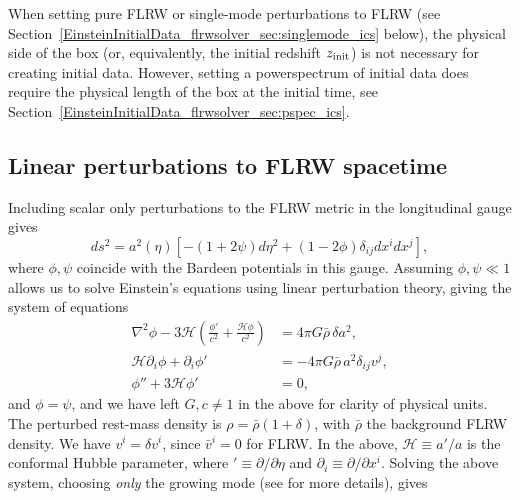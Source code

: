When setting pure FLRW or single-mode perturbations to FLRW (see Section~\ref{EinsteinInitialData_flrwsolver_sec:singlemode_ics} below), the physical side of the box (or, equivalently, the initial redshift $z_{\rm init}$) is not necessary for creating initial data. However, setting a powerspectrum of initial data does require the physical length of the box at the initial time, see Section~\ref{EinsteinInitialData_flrwsolver_sec:pspec_ics}.


\subsection{Linear perturbations to FLRW spacetime}

Including scalar only perturbations to the FLRW metric in the longitudinal gauge gives
\begin{equation}\label{EinsteinInitialData_flrwsolver_eq:perturbed_metric}
	ds^2 = a^2(\eta) \left[ - \left(1 + 2\psi\right) d\eta^2 + \left(1 - 2\phi \right) \delta_{ij}dx^i dx^j \right],
\end{equation}
where $\phi,\psi$ coincide with the Bardeen potentials \cite{EinsteinInitialData_flrwsolver_bardeen1980} in this gauge. Assuming $\phi,\psi\ll1$ allows us to solve Einstein's equations using linear perturbation theory, giving the system of equations \cite{EinsteinInitialData_flrwsolver_macpherson2017,EinsteinInitialData_flrwsolver_macpherson2019}
 \begin{subequations} \label{EinsteinInitialData_flrwsolver_eqs:perturbed_einstein}
	\begin{align}
		\nabla^{2}\phi - 3 \mathcal{H}\left(\frac{\phi'}{c^2} + \frac{\mathcal{H} \phi}{c^2}\right) &= 4\pi G \bar{\rho}\,\delta a^{2}, \label{EinsteinInitialData_flrwsolver_eq:einstein_1} \\ 
		\mathcal{H} \partial_{i}\phi + \partial_{i}\phi' &= -4\pi G\bar{\rho} \,a^{2} \delta_{ij}v^{j}, \label{EinsteinInitialData_flrwsolver_eq:einstein_2} \\ 
		\phi'' + 3\mathcal{H}\phi' &=0, \label{EinsteinInitialData_flrwsolver_eq:einstein_3}
	\end{align}	
\end{subequations}
and $\phi=\psi$, and we have left $G, c\neq 1$ in the above for clarity of physical units. The perturbed rest-mass density is $\rho = \bar{\rho} \left(1 + \delta \right)$, with $\bar{\rho}$ the background FLRW density. We have $v^i = \delta v^i$, since $\bar{v}^i = 0$ for FLRW. In the above, $\mathcal{H}\equiv a'/a$ is the conformal Hubble parameter, where $'\equiv \partial/\partial\eta$ and $\partial_i \equiv \partial/\partial x^i$. Solving the above system, choosing \emph{only} the growing mode (see \cite{EinsteinInitialData_flrwsolver_macpherson2019} for more details), gives
